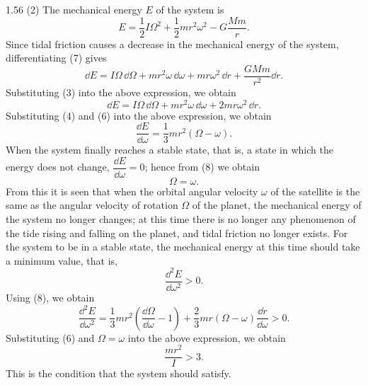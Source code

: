 \begin{solution}{1.56}
(2) The mechanical energy $E$ of the system is
\begin{equation}
E=\frac{1}{2}I\Omega^2+\frac{1}{2}mr^2\omega^2-G\frac{Mm}{r}. \tag{7}
\end{equation}
Since tidal friction causes a decrease in the mechanical energy of the system, differentiating (7) gives
\[
\dd E=I\Omega\,\dd\Omega+mr^2\omega\,\dd\omega+mr\omega^2\,\dd r+\frac{GMm}{r^2}\dd r.
\]
Substituting (3) into the above expression, we obtain
\[
\dd E=I\Omega\,\dd\Omega+mr^2\omega\,\dd\omega+2mr\omega^2\,\dd r.
\]
Substituting (4) and (6) into the above expression, we obtain
\begin{equation}
\frac{\dd E}{\dd\omega}=\frac{1}{3}mr^2\left(\Omega-\omega\right). \tag{8}
\end{equation}
When the system finally reaches a stable state, that is, a state in which the energy does not change, $\dfrac{\dd E}{\dd\omega}=0$; hence from (8) we obtain
\[
\Omega=\omega.
\]
From this it is seen that when the orbital angular velocity $\omega$ of the satellite is the same as the angular velocity of rotation $\Omega$ of the planet, the mechanical energy of the system no longer changes; at this time there is no longer any phenomenon of the tide rising and falling on the planet, and tidal friction no longer exists. For the system to be in a stable state, the mechanical energy at this time should take a minimum value, that is,
\[
\frac{\dd^2E}{\dd\omega^2}>0.
\]
Using (8), we obtain
\[
\frac{\dd^2E}{\dd\omega^2}=\frac{1}{3}mr^2\left(\frac{\dd\Omega}{\dd\omega}-1\right)+\frac{2}{3}mr\left(\Omega-\omega\right)\frac{\dd r}{\dd\omega}>0.
\]
Substituting (6) and $\Omega=\omega$ into the above expression, we obtain
\[
\frac{mr^2}{I}>3.
\]
This is the condition that the system should satisfy.
\end{solution}

